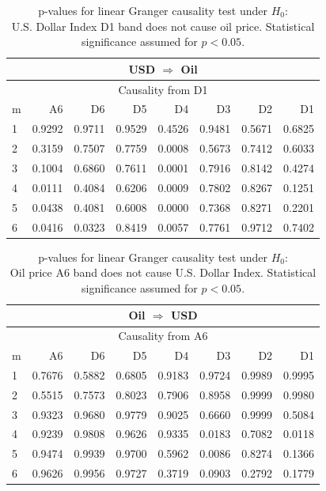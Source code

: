 %
%
\begin{table}[H]
\begin{center}
\begin{tabular}{l|r r r r r r r}
\hline\hline
\multicolumn{8}{c}{USD $\Rightarrow$ Oil}\\
\hline
\multicolumn{8}{c}{Causality from D1}\\
\hline\hline
m & A6 & D6 & D5 & D4 & D3 & D2 & D1 \\
\hline
1 & 0.9292 & 0.9711 & 0.9529 & 0.4526 & 0.9481 & 0.5671 & 0.6825 \\
2 & 0.3159 & 0.7507 & 0.7759 & \cellcolor{mygreen}0.0008 & 0.5673 & 0.7412 & 0.6033 \\
3 & 0.1004 & 0.6860 & 0.7611 & \cellcolor{mygreen}0.0001 & 0.7916 & 0.8142 & 0.4274 \\
4 & \cellcolor{mygrey}0.0111 & 0.4084 & 0.6206 & \cellcolor{mygreen}0.0009 & 0.7802 & 0.8267 & 0.1251 \\
5 & \cellcolor{mygrey}0.0438 & 0.4081 & 0.6008 & \cellcolor{mygrey}0.0000 & 0.7368 & 0.8271 & 0.2201 \\
6 & \cellcolor{mygrey}0.0416 & \cellcolor{mygrey}0.0323 & 0.8419 & \cellcolor{mygrey}0.0057 & 0.7761 & 0.9712 & 0.7402 \\
\hline\hline
\end{tabular}
\caption{p-values for linear Granger causality test under $H_0$:\\
U.S. Dollar Index D1 band does not cause oil price. Statistical significance assumed for $p<0.05$.}
\end{center}
\end{table}

%
%
\begin{table}[H]
\begin{center}
\begin{tabular}{l|r r r r r r r}
\hline\hline
\multicolumn{8}{c}{Oil $\Rightarrow$ USD}\\
\hline
\multicolumn{8}{c}{Causality from A6}\\
\hline\hline
m & A6 & D6 & D5 & D4 & D3 & D2 & D1 \\
\hline
1 & 0.7676 & 0.5882 & 0.6805 & 0.9183 & 0.9724 & 0.9989 & 0.9995 \\
2 & 0.5515 & 0.7573 & 0.8023 & 0.7906 & 0.8958 & 0.9999 & 0.9980 \\
3 & 0.9323 & 0.9680 & 0.9779 & 0.9025 & 0.6660 & 0.9999 & 0.5084 \\
4 & 0.9239 & 0.9808 & 0.9626 & 0.9335 & \cellcolor{mygreen}0.0183 & 0.7082 & \cellcolor{mygreen}0.0118 \\
5 & 0.9474 & 0.9939 & 0.9700 & 0.5962 & \cellcolor{mygreen}0.0086 & 0.8274 & 0.1366 \\
6 & 0.9626 & 0.9956 & 0.9727 & 0.3719 & 0.0903 & 0.2792 & 0.1779 \\
\hline\hline
\end{tabular}
\caption{p-values for linear Granger causality test under $H_0$:\\
Oil price A6 band does not cause U.S. Dollar Index. Statistical significance assumed for $p<0.05$.}
\end{center}
\end{table}

